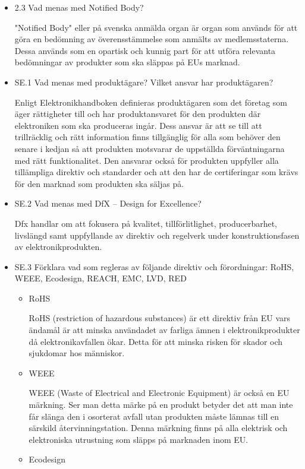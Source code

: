 \documentclass{article}
\begin{document}
\begin{itemize}
    \item 2.3 Vad menas med Notified Body?

    "Notified Body" eller på svenska anmälda organ är organ som används för att göra en bedömning av överensstämmelse som anmälts av medlemsstaterna. Dessa används som en opartisk och kunnig part för att utföra relevanta bedömningar av produkter som ska släppas på EUs marknad. 

    \item SE.1 Vad menas med produktägare? Vilket ansvar har produktägaren?

        Enligt Elektronikhandboken definieras produktägaren som det företag som äger rättigheter till och har produktansvaret för den produkten där elektroniken som ska produceras ingår. Dess ansvar är att se till att trillräcklig och rätt information finns tillgänglig för alla som behöver den senare i kedjan så att produkten motsvarar de uppställda förväntningarna med rätt funktionalitet. Den ansvarar också för produkten uppfyller alla tillämpliga direktiv och standarder och att den har de certiferingar som krävs för den marknad som produkten ska säljas på.
    
    \item SE.2 Vad menas med DfX – Design for Excellence?

        Dfx handlar om att fokusera på kvalitet, tillförlitlighet, producerbarhet, livslängd samt uppfyllande av direktiv och regelverk under konstruktionsfasen av elektronikprodukten. 
    
    \item SE.3 Förklara vad som regleras av följande direktiv och förordningar: RoHS, WEEE, Ecodesign, REACH,
    EMC, LVD, RED

        \begin{itemize}
            \item RoHS

                RoHS (restriction of hazardous substances) är ett direktiv från EU vars ändamål är att minska användadet av farliga ämnen i elektronikprodukter då elektronikavfallen ökar. Detta för att minska risken för skador och sjukdomar hos människor.
            \item WEEE

                WEEE (Waste of Electrical and Electronic Equipment) är också en EU märkning. Ser man detta märke på en produkt betyder det att man inte får slänga den i osorterat avfall utan produkten måste lämnas till en särskild återvinningstation. Denna märkning finns på alla elektrisk och elektroniska utrustning som släpps på marknaden inom EU.
            \item Ecodesign


\end{itemize}
\end{itemize}
\end{document}
